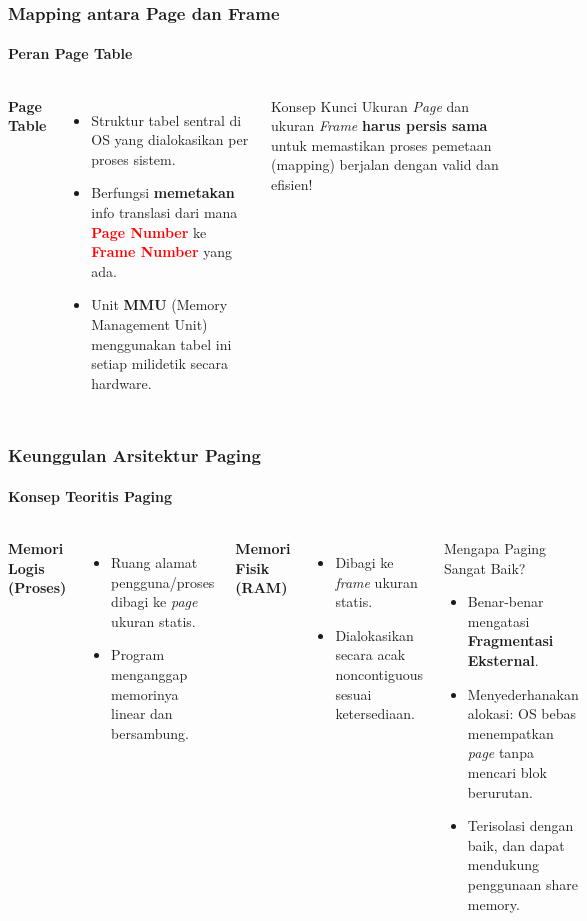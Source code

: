 \documentclass[t,aspectratio=169,xcolor=dvipsnames]{beamer}
\newcommand{\tem}[1]{\textbf{\textcolor{red}{#1}}}
\begin{document}
\begin{frame}
    \frametitle{Mapping antara Page dan Frame}
    \framesubtitle{Peran Page Table}
    \small
    \begin{columns}[T]
        \textbf{Page Table}
        \begin{itemize}
            \item Struktur tabel sentral di OS yang dialokasikan per proses sistem.
            \item Berfungsi \textbf{memetakan} info translasi dari mana \tem{Page Number} ke \tem{Frame Number} yang ada.
            \item Unit \textbf{MMU} (Memory Management Unit) menggunakan tabel ini setiap milidetik secara hardware.
        \end{itemize}
        \begin{alertblock}{Konsep Kunci}
            Ukuran \textit{Page} dan ukuran \textit{Frame} \textbf{harus persis sama} untuk memastikan proses pemetaan (mapping) berjalan dengan valid dan efisien!
        \end{alertblock}
    \end{columns}
\end{frame}

\begin{frame}
    \frametitle{Keunggulan Arsitektur Paging}
    \framesubtitle{Konsep Teoritis Paging}
    \small
    \begin{columns}[T]
        \textbf{Memori Logis (Proses)}
        \begin{itemize}
            \item Ruang alamat pengguna/proses dibagi ke \textit{page} ukuran statis.
            \item Program menganggap memorinya linear dan bersambung.
        \end{itemize}
        \vspace{3mm}
        \textbf{Memori Fisik (RAM)}
        \begin{itemize}
            \item Dibagi ke \textit{frame} ukuran statis.
            \item Dialokasikan secara acak noncontiguous sesuai ketersediaan.
        \end{itemize}
        \begin{alertblock}{Mengapa Paging Sangat Baik?}
            \begin{itemize}
                \item Benar-benar mengatasi \textbf{Fragmentasi Eksternal}.
                \item Menyederhanakan alokasi: OS bebas menempatkan \textit{page} tanpa mencari blok berurutan.
                \item Terisolasi dengan baik, dan dapat mendukung penggunaan share memory.
            \end{itemize}
        \end{alertblock}
    \end{columns}
\end{frame}
\end{document}
